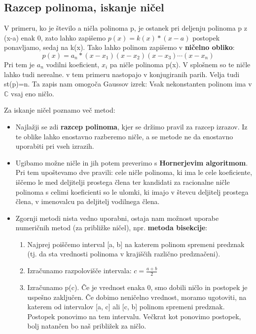 \subsection{Razcep polinoma, iskanje ničel}
V primeru, ko je število a ničla polinoma p, je ostanek pri deljenju polinoma p z (x-a) enak 0, zato lahko zapišemo $p(x)= k(x)*(x-a)$ postopek ponavljamo, sedaj na k(x). Tako lahko polinom zapišemo v \textbf{ničelno obliko}: 
\[
p(x)= a_n*(x-x_1)(x-x_2)(x-x_3)\cdots(x-x_n)
\]
Pri tem je $a_n$ vodilni koeficient, $x_i$ pa ničle polinoma p(x). V splošnem so te ničle lahko tudi nerealne. v tem primeru nastopajo v konjugiranih parih. Velja tudi st(p)=n. Ta zapis nam omogoča Gaussov izrek: Vsak nekonstanten polinom ima v $\mathbb{C}$ vsaj eno ničlo.

Za iskanje ničel poznamo več metod:
\begin{itemize}
\item Najlažji se zdi \textbf{razcep polinoma}, kjer se držimo pravil za razcep izrazov. Iz te oblike lahko enostavno razberemo ničle, a se metode ne da enostavno uporabiti pri vseh izrazih.
\item Ugibamo možne ničle in jih potem preverimo s \textbf{Hornerjevim algoritmom}. Pri tem upoštevamo dve pravili: cele ničle polinoma, ki ima le cele koeficiente, iščemo le med deljitelji prostega člena ter kandidati za racionalne ničle polinoma s celimi koeficienti so le ulomki, ki imajo v števcu deljitelj prostega člena, v imenovalcu pa deljitelj vodilnega člena.
\item Zgornji metodi nista vedno uporabni, ostaja nam možnost uporabe numeričnih metod (za približke ničel), npr. \textbf{metoda bisekcije}:\begin{enumerate}
\item Najprej poiščemo interval [a, b] na katerem polinom spremeni predznak (tj. da sta vrednosti polinoma v krajiščih različno predznačeni).
\item Izračunamo razpolovišče intervala: $c=\frac{a+b}{2}$
\item Izračunamo p(c). Če je vrednost enaka 0, smo dobili ničlo in postopek je uspešno zaključen. Če dobimo neničelno vrednost, moramo ugotoviti, na katerem od intervalov [a, c] ali [c, b] polinom spremeni predznak. Postopek ponovimo na tem intervalu. Večkrat kot ponovimo postopek, bolj natančen bo naš približek za ničlo. 
\end{enumerate}
\end{itemize}


